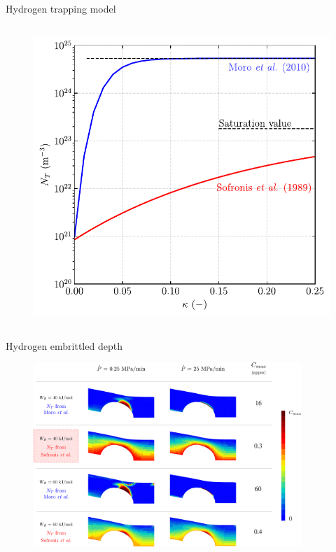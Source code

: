 \documentclass[9pt]{beamer}
\begin{document}
\begin{frame}{Hydrogen trapping model}
\begin{columns}
	\begin{column}{0.45\textwidth}
	\begin{figure}
		\centering
		\includegraphics[width=1.0\textwidth]{Images/plot_NT_epcum.pdf} \\
	\end{figure}
	\end{column}
\end{columns}

\end{frame}


\begin{frame}{Hydrogen embrittled depth}

\begin{figure}
	\centering
	\includegraphics[width=0.9\textwidth]{Images/table_zoom.png} \\
\end{figure}

\end{frame}
\end{document}

